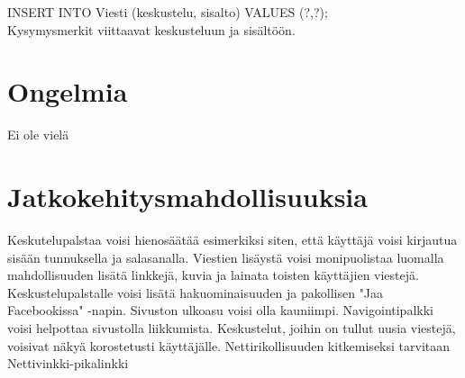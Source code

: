 \documentclass[titlepage]{article}
\begin{document}
INSERT INTO Viesti (keskustelu, sisalto) VALUES (?,?); \\

\noindent Kysymysmerkit viittaavat keskusteluun ja sisältöön.

\section*{Ongelmia}

Ei ole vielä


\section*{Jatkokehitysmahdollisuuksia}

Keskutelupalstaa voisi hienosäätää esimerkiksi siten, että käyttäjä voisi kirjautua sisään tunnuksella ja salasanalla. Viestien lisäystä voisi monipuolistaa luomalla mahdollisuuden lisätä linkkejä, kuvia ja lainata toisten käyttäjien viestejä. Keskustelupalstalle voisi lisätä hakuominaisuuden ja pakollisen "Jaa Facebookissa" -napin. Sivuston ulkoasu voisi olla kauniimpi. Navigointipalkki voisi helpottaa sivustolla liikkumista. Keskustelut, joihin on tullut uusia viestejä, voisivat näkyä korostetusti käyttäjälle. Nettirikollisuuden kitkemiseksi tarvitaan Nettivinkki-pikalinkki 
\end{document}
